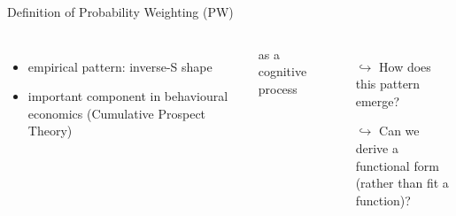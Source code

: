 \begin{frame}{Definition of Probability Weighting (PW)}
\begin{columns}
\begin{itemize}
  \item empirical pattern: inverse-S shape
  \item important component in behavioural economics (Cumulative Prospect Theory)
\end{itemize}
\vspace{1em}
\bi
	\item as a cognitive process
	\item	{}
\ei
\vspace{1em}
	\begin{itemize}
	  \item[$\hookrightarrow$] How does this pattern emerge?
  	\item[$\hookrightarrow$] Can we derive a functional form\\ 
	(rather than fit a function)?
	\end{itemize}

\end{columns}
\end{frame}

